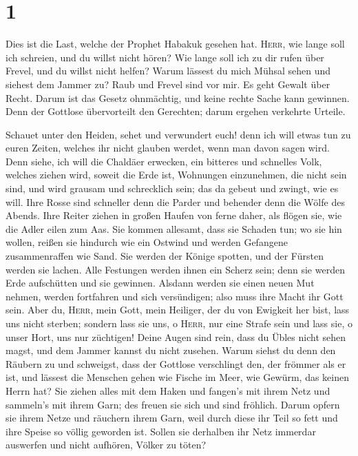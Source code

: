 \hypertarget{section}{%
\section{1}\label{section}}

 Dies ist die Last, welche der Prophet Habakuk gesehen
hat.  \textsc{Herr}, wie lange soll ich schreien, und du
willst nicht hören? Wie lange soll ich zu dir rufen über Frevel, und du
willst nicht helfen?  Warum lässest du mich Mühsal sehen
und siehest dem Jammer zu? Raub und Frevel sind vor mir. Es geht Gewalt
über Recht.  Darum ist das Gesetz ohnmächtig, und keine
rechte Sache kann gewinnen. Denn der Gottlose übervorteilt den
Gerechten; darum ergehen verkehrte Urteile.

 Schauet unter den Heiden, sehet und verwundert euch! denn
ich will etwas tun zu euren Zeiten, welches ihr nicht glauben werdet,
wenn man davon sagen wird.  Denn siehe, ich will die
Chaldäer erwecken, ein bitteres und schnelles Volk, welches ziehen wird,
soweit die Erde ist, Wohnungen einzunehmen, die nicht sein sind,
 und wird grausam und schrecklich sein; das da gebeut und
zwingt, wie es will.  Ihre Rosse sind schneller denn die
Parder und behender denn die Wölfe des Abends. Ihre Reiter ziehen in
großen Haufen von ferne daher, als flögen sie, wie die Adler eilen zum
Aas.  Sie kommen allesamt, dass sie Schaden tun; wo sie
hin wollen, reißen sie hindurch wie ein Ostwind und werden Gefangene
zusammenraffen wie Sand.  Sie werden der Könige spotten,
und der Fürsten werden sie lachen. Alle Festungen werden ihnen ein
Scherz sein; denn sie werden Erde aufschütten und sie gewinnen.
 Alsdann werden sie einen neuen Mut nehmen, werden
fortfahren und sich versündigen; also muss ihre Macht ihr Gott sein.
 Aber du, \textsc{Herr}, mein Gott, mein Heiliger, der du
von Ewigkeit her bist, lass uns nicht sterben; sondern lass sie uns, o
\textsc{Herr}, nur eine Strafe sein und lass sie, o unser Hort, uns nur
züchtigen!  Deine Augen sind rein, dass du Übles nicht
sehen magst, und dem Jammer kannst du nicht zusehen. Warum siehst du
denn den Räubern zu und schweigst, dass der Gottlose verschlingt den,
der frömmer als er ist,  und lässest die Menschen gehen
wie Fische im Meer, wie Gewürm, das keinen Herrn hat? 
Sie ziehen alles mit dem Haken und fangen's mit ihrem Netz und sammeln's
mit ihrem Garn; des freuen sie sich und sind fröhlich. 
Darum opfern sie ihrem Netze und räuchern ihrem Garn, weil durch diese
ihr Teil so fett und ihre Speise so völlig geworden ist. 
Sollen sie derhalben ihr Netz immerdar auswerfen und nicht aufhören,
Völker zu töten?


